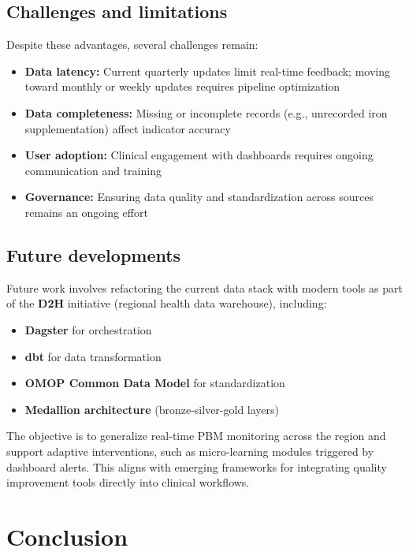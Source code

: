 \documentclass{IOS-Book-Article}
\begin{document}
\subsection{Challenges and limitations}

Despite these advantages, several challenges remain:

\begin{itemize}
\item \textbf{Data latency:} Current quarterly updates limit real-time feedback; moving toward monthly or weekly updates requires pipeline optimization
\item \textbf{Data completeness:} Missing or incomplete records (e.g., unrecorded iron supplementation) affect indicator accuracy
\item \textbf{User adoption:} Clinical engagement with dashboards requires ongoing communication and training
\item \textbf{Governance:} Ensuring data quality and standardization across sources remains an ongoing effort
\end{itemize}

\subsection{Future developments}

Future work involves refactoring the current data stack with modern tools as part of the \textbf{D2H} initiative (regional health data warehouse), including:

\begin{itemize}
\item \textbf{Dagster} for orchestration
\item \textbf{dbt} for data transformation
\item \textbf{OMOP Common Data Model} for standardization
\item \textbf{Medallion architecture} (bronze-silver-gold layers)
\end{itemize}

The objective is to generalize real-time PBM monitoring across the region and support adaptive interventions, such as micro-learning modules triggered by dashboard alerts. This aligns with emerging frameworks for integrating quality improvement tools directly into clinical workflows.

\section{Conclusion}
\end{document}
